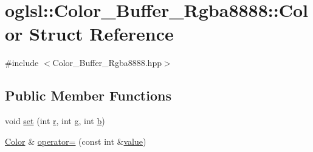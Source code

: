 \hypertarget{structoglsl_1_1_color___buffer___rgba8888_1_1_color}{}\section{oglsl\+:\+:Color\+\_\+\+Buffer\+\_\+\+Rgba8888\+:\+:Color Struct Reference}
\label{structoglsl_1_1_color___buffer___rgba8888_1_1_color}


{\ttfamily \#include $<$Color\+\_\+\+Buffer\+\_\+\+Rgba8888.\+hpp$>$}

\subsection*{Public Member Functions}
\begin{DoxyCompactItemize}
\item 
void \mbox{\hyperlink{structoglsl_1_1_color___buffer___rgba8888_1_1_color_af15354c260abdd57b06d4b29cc36197f}{set}} (int \mbox{\hyperlink{structoglsl_1_1_color___buffer___rgba8888_1_1_color_a35df3a53fbd67450bf8781d7decf25ea}{r}}, int \mbox{\hyperlink{structoglsl_1_1_color___buffer___rgba8888_1_1_color_a3abc80e31a6eea04a6a82e073cf82997}{g}}, int \mbox{\hyperlink{structoglsl_1_1_color___buffer___rgba8888_1_1_color_ad6bd92c117c6cf16b2508d414b3d2514}{b}})
\item 
\mbox{\hyperlink{structoglsl_1_1_color___buffer___rgba8888_1_1_color}{Color}} \& \mbox{\hyperlink{structoglsl_1_1_color___buffer___rgba8888_1_1_color_ac6313a1fc7e2fe36405131ef17c83866}{operator=}} (const int \&\mbox{\hyperlink{structoglsl_1_1_color___buffer___rgba8888_1_1_color_a78e395a54038acf78582dce1c3cfb950}{value}})
\end{DoxyCompactItemize}
